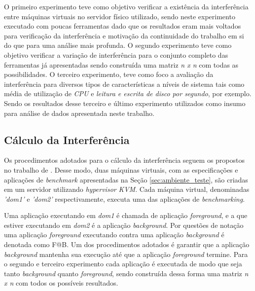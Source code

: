 O primeiro experimento teve como objetivo verificar a existência da interferência entre máquinas virtuais no servidor físico utilizado, sendo neste experimento executado com poucas ferramentas dado que os resultados eram mais voltados para verificação da interferência e motivação da continuidade do trabalho em si do que para uma análise mais profunda. O segundo experimento teve como objetivo verificar a variação de interferência para o conjunto completo das ferramentas já apresentadas sendo construída uma matriz \textit{n x n} com todas as possibilidades. O terceiro experimento, teve como foco a avaliação da interferência para diversos tipos de características a níveis de sistema tais como média de utilização de \textit{CPU} e \textit{leitura e escrita de disco por segundo}, por exemplo. Sendo os resultados desse terceiro e último experimento utilizados como insumo para análise de dados apresentada neste trabalho.%

\subsection{Cálculo da Interferência}
Os procedimentos adotados para o cálculo da interferência seguem os propostos no trabalho de . Desse modo, duas máquinas virtuais, com as especificações e aplicações de \textit{benchmark} apresentadas na Seção \ref{sec:ambiente_teste}, são criadas em um servidor utilizando \textit{hypervisor} \textit{KVM}. Cada máquina virtual, denominadas \textit{'dom1'} e \textit{'dom2'} respectivamente, executa uma das aplicações de \textit{benchmarking}. 

Uma aplicação executando em \textit{dom1} é chamada de aplicação \textit{foreground}, e a que estiver executando em \textit{dom2} é a aplicação \textit{background}. Por questões de notação uma aplicação \textit{foreground} executando contra uma aplicação \textit{background} é denotada como F@B. Um dos procedimentos adotados é garantir que a aplicação \textit{background} mantenha sua execução até que a aplicação \textit{foreground} termine. Para o segundo e terceiro experimento cada aplicação é executada de modo que seja tanto \textit{background} quanto \textit{foreground}, sendo construída dessa forma uma matriz \textit{n x n} com todos os possíveis resultados. %

